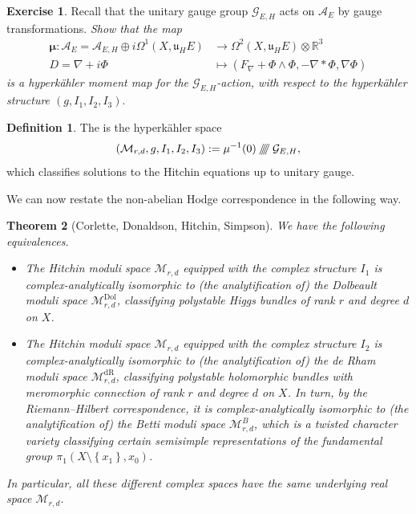 \documentclass[12pt,a4paper]{amsbook}
\newtheorem{thm}{Theorem}[chapter]
\theoremstyle{remark} \newtheorem{rmk}[thm]{Remark}
\theoremstyle{definition} \newtheorem{defn}[thm]{Definition}
\theoremstyle{definition} \newtheorem{ex}[thm]{Example}
\theoremstyle{definition} \newtheorem{ej}{Exercise}
\let\emph\relax
\newcommand{\hkgit}{\mathbin{/\mkern-6mu/\mkern-6mu/\mkern-6mu/}}
\newcommand{\bbR}{\mathbb R}
\newcommand{\cA}{\mathcal A}
\newcommand{\cG}{\mathcal G}
\newcommand{\cM}{\mathcal M}
\newcommand{\fu}{\mathfrak u}
\newcommand{\dR}{\mathrm{dR}}
\newcommand{\Dol}{\mathrm{Dol}}
\begin{document}
\begin{ej}
Recall that the unitary gauge group $\cG_{E,H}$ acts on $\cA_E$ by gauge transformations. \textit{Show that the map}
\begin{align*}
  \bm{\mu}: \cA_E = \cA_{E,H} \oplus i\Omega^1(X,\fu_H E) & \longrightarrow  \Omega^2(X,\fu_H E) \otimes \bbR^3 \\
D=\nabla + i \Phi    & \longmapsto (F_\nabla + \Phi \wedge \Phi, -\nabla * \Phi, \nabla \Phi)
\end{align*}
\textit{is a hyperkähler moment map for the $\cG_{E,H}$-action, with respect to the hyperkähler structure $(g,I_1,I_2,I_3)$}.
\end{ej}

\begin{defn}
  The \emph{Hitchin moduli space} is the hyperkähler space
  \begin{equation*}
(\cM_{r,d},g,I_1,I_2,I_3):= \mu^{-1}(0) \hkgit \cG_{E,H},
  \end{equation*}
which classifies solutions to the Hitchin equations up to unitary gauge.
\end{defn}

We can now restate the non-abelian Hodge correspondence in the following way.

\begin{thm}[Corlette, Donaldson, Hitchin, Simpson]
  We have the following equivalences.
  \begin{itemize}
\item The Hitchin moduli space $\cM_{r,d}$ equipped with the complex structure $I_1$ is complex-analytically isomorphic to (the analytification of) the Dolbeault moduli space $\cM_{r,d}^{\Dol}$, classifying polystable Higgs bundles of rank $r$ and degree $d$ on $X$.
\item The Hitchin moduli space $\cM_{r,d}$ equipped with the complex structure $I_2$ is complex-analytically isomorphic to (the analytification of) the de Rham moduli space $\cM_{r,d}^{\dR}$, classifying polystable holomorphic bundles with meromorphic connection of rank $r$ and degree $d$ on $X$. In turn, by the Riemann--Hilbert correspondence, it is complex-analytically isomorphic to (the analytification of) the Betti moduli space $\cM_{r,d}^B$, which is a twisted character variety classifying certain semisimple representations of the fundamental group $\pi_1(X\setminus \left\{ x_1 \right\},x_0)$.
  \end{itemize}
  In particular, all these different complex spaces have the same underlying real space $\cM_{r,d}$.
\end{thm}
\end{document}
